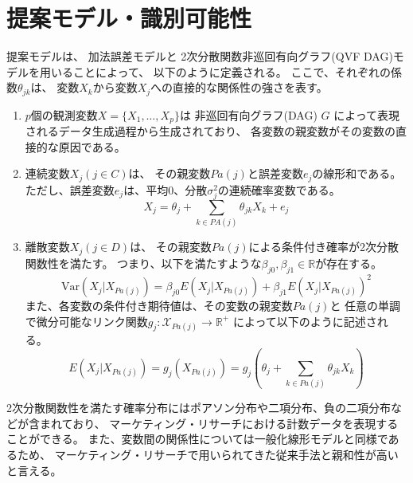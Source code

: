 \documentclass[uplatex]{jsarticle}
\theoremstyle{definition}
\begin{document}
\section{提案モデル・識別可能性}
提案モデルは、
加法誤差モデル\cite{Park2020-ey}と
2次分散関数非巡回有向グラフ(QVF DAG)モデル\cite{Park2017-hw}を用いることによって、
以下のように定義される。
ここで、それぞれの係数$\theta_{jk}$は、
変数$X_k$から変数$X_j$への直接的な関係性の強さを表す。

\begin{enumerate}
  \item
  $p$個の観測変数$X = \{ X_1, \dots, X_p \}$は
  非巡回有向グラフ(DAG) $G$ によって表現されるデータ生成過程から生成されており、
  各変数の親変数がその変数の直接的な原因である。

  \item
  連続変数$X_j (j\in C)$は、
  その親変数$Pa(j)$と誤差変数$e_j$の線形和である。
  ただし、誤差変数$e_j$は、平均0、分散$\sigma_j^2$の連続確率変数である。
  \begin{equation*}
    X_j = \theta_j + \sum_{k \in PA(j)} \theta_{jk}X_k + e_j
  \end{equation*}

  \item
  離散変数$X_j (j \in D)$は、
  その親変数$Pa(j)$による条件付き確率が2次分散関数性を満たす。
  つまり、以下を満たすような$\beta_{j0}, \beta_{j1} \in \mathbb R$が存在する。
  \begin{equation*}
    \mathrm{Var}(X_j|X_{Pa(j)}) = \beta_{j0} E(X_j | X_{Pa(j)}) + \beta_{j1} E(X_j | X_{Pa(j)})^2
  \end{equation*}
  また、各変数の条件付き期待値は、その変数の親変数$Pa(j)$と
  任意の単調で微分可能なリンク関数$g_j \colon \mathcal X_{Pa(j)} \rightarrow \mathbb R^+$
  によって以下のように記述される。
  \begin{equation*}
    E(X_j | X_{Pa(j)})
    = g_j(X_{Pa(j)})
    = g_j \left(\theta_j + \sum_{k \in Pa(j)} \theta_{jk}X_k \right)
  \end{equation*}
\end{enumerate}

2次分散関数性を満たす確率分布にはポアソン分布や二項分布、負の二項分布などが含まれており、
マーケティング・リサーチにおける計数データを表現することができる。
また、変数間の関係性については一般化線形モデルと同様であるため、
マーケティング・リサーチで用いられてきた従来手法と親和性が高いと言える。
\end{document}
